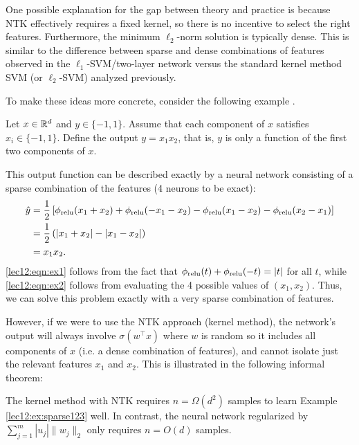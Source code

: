 One possible explanation for the gap between theory and practice is because NTK effectively requires a fixed kernel, so there is no incentive to select the right features. Furthermore, the minimum $\ell_2$-norm solution is typically dense. This is similar to the difference between sparse and dense combinations of features observed in the $\ell_1$-SVM/two-layer network versus the standard kernel method SVM (or $\ell_2$-SVM) analyzed previously.

To make these ideas more concrete, consider the following example \cite{wei2020regularization}. 
\begin{example}\label{lec12:ex:sparse123}
Let $x \in \mathbb R^d$ and $y \in \{-1, 1\}$. Assume that each component of $x$ satisfies $x_i \in \{ -1, 1\}$. Define the output $y = x_1x_2$, that is, $y$ is only a function of the first two components of $x$.

This output function can be described exactly by a neural network consisting of a sparse combination of the features (4 neurons to be exact):
\begin{align}
\hat y &= \frac{1}{2} \left[ \phi_{\textup{relu}}(x_1 + x_2) + \phi_{\textup{relu}}(-x_1 - x_2)  - \phi_{\textup{relu}}(x_1 - x_2) -  \phi_{\textup{relu}}(x_2 - x_1)  \right] \\
&= \frac{1}{2}\left( |x_1 + x_2| - |x_1 - x_2| \right) \label{lec12:eqn:ex1} \\
&= x_1x_2. \label{lec12:eqn:ex2}
\end{align}
\eqref{lec12:eqn:ex1} follows from the fact that $\phi_{\textup{relu}}(t) + \phi_{\textup{relu}}(-t) = |t|$ for all $t$, while \eqref{lec12:eqn:ex2} follows from evaluating the 4 possible values of $(x_1, x_2)$. Thus, we can solve this problem exactly with a very sparse combination of features.

However, if we were to use the NTK approach (kernel method), the network's output will always involve $\sigma(w^\top x)$ where $w$ is random so it includes all components of $x$ (i.e. a dense combination of features), and cannot isolate just the relevant features $x_1$ and $x_2$. This is illustrated in the following informal theorem:
\begin{theorem}
The kernel method with NTK requires $n = \Omega(d^2)$ samples to learn Example \ref{lec12:ex:sparse123} well. In contrast, the neural network regularized by $\sum_{j = 1}^m | u_j| \| w_j\|_2$ only requires $n = O(d)$ samples.
\end{theorem}
\end{example}


